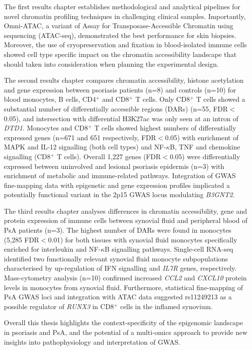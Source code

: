 {\begin{minipage}[t]{1.1\linewidth}
\noindent The first results chapter establishes methodological and analytical pipelines for novel chromatin profiling techniques in challenging clinical samples. Importantly, Omni-ATAC, a variant of Assay for Transposase-Accessible Chromatin using sequencing (ATAC-seq), demonstrated the best performance for skin biopsies. Moreover, the use of cryopreservation and fixation in blood-isolated immune cells showed cell type specific impact on the chromatin accessibility landscape that should taken into consideration when planning the experimental design.

\noindent The second results chapter compares chromatin accessibility, histone acetylation and gene expression between psoriasis patients (n=8) and controls (n=10) for blood monocytes, B cells, CD4$^+$ and CD8$^+$ T cells. Only CD8$^+$ T cells showed a substantial number of differentially accessible regions (DARs) (n=55, FDR$<$ 0.05), and intersection with differential H3K27ac was only seen at an intron of \textit{DTD1}. Monocytes and CD8$^+$ T cells showed highest numbers of differentially expressed genes (n=671 and 651 respectively, FDR$<$0.05) with enrichment of MAPK and IL-12 signalling (both cell types) and NF-$\kappa$B, TNF and chemokine signalling (CD8$^+$ T cells). Overall 1,227 genes (FDR$<$0.05) were differentially expressed between uninvolved and lesional psoriasis epidermis (n=3) with enrichment of metabolic and immune-related pathways. Integration of GWAS fine-mapping data with epigenetic and gene expression profiles implicated a potentially functional variant in the 2p15 GWAS locus modulating \textit{B3GNT2}.

\noindent The third results chapter analyses differences in chromatin accessibility, gene and protein expression of immune cells between synovial fluid and peripheral blood of PsA patients (n=3). The highest number of DARs were found in monocytes (5,285 FDR$<$0.01) for both tissues with synovial fluid monocytes specifically enriched for interleukin and NF-$\kappa$B signalling pathways. Single-cell RNA-seq identified two functionally relevant synovial fluid monocyte subpopulations characterised by up-regulation of IFN signalling and \textit{IL7R} genes, respectively. Mass-cytometry analysis (n=10) confirmed increased \textit{CCL2} and \textit{CXCL10} protein levels in monocytes from synovial fluid. Furthermore, statistical fine-mapping of PsA GWAS loci and integration with  ATAC data suggested rs11249213 as a possible regulator of \textit{RUNX3} in CD8$^+$ cells in the inflamed synovium.

\noindent Overall this thesis highlights the context-specificity of the epigenomic landscape in psoriasis and PsA, and the potential of a multi-omics approach to provide new insights into pathophysiology and interpretation of GWAS.\\

\end{minipage}}
%


